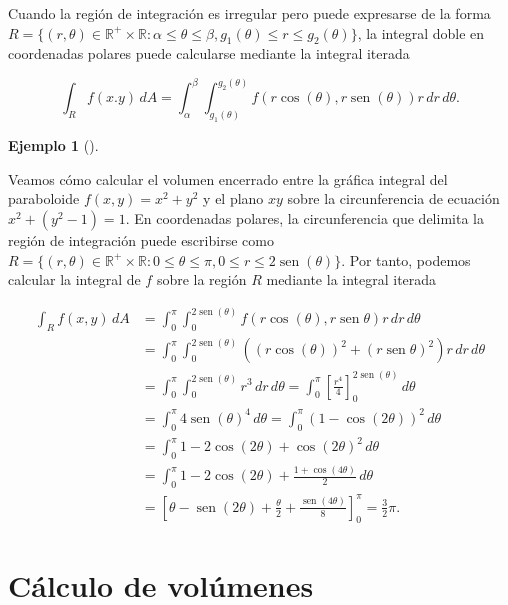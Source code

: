 \documentclass[
  a4paper,
]{scrreport}
\theoremstyle{definition}
\theoremstyle{definition}
\newtheorem{example}{Ejemplo}[chapter]
\theoremstyle{definition}
\theoremstyle{plain}
\theoremstyle{plain}
\theoremstyle{plain}
\theoremstyle{remark}
\begin{document}
Cuando la región de integración es irregular pero puede expresarse de la
forma
\(R=\{(r,\theta)\in \mathbb{R}^+\times \mathbb{R}: \alpha\leq \theta\leq \beta, g_1(\theta)\leq r\leq g_2(\theta)\}\),
la integral doble en coordenadas polares puede calcularse mediante la
integral iterada

\[
\int_R f(x.y)\,dA 
= \int_{\alpha}^{\beta} \int_{g_1(\theta)}^{g_2(\theta)} f(r\cos(\theta),r\operatorname{sen}(\theta))r\,dr\,d\theta.
\]

\begin{example}[]\protect\hypertarget{exm-integral-region-irregular-polar}{}\label{exm-integral-region-irregular-polar}

Veamos cómo calcular el volumen encerrado entre la gráfica integral del
paraboloide \(f(x,y)=x^2+y^2\) y el plano \(xy\) sobre la circunferencia
de ecuación \(x^2+(y^2-1)=1\). En coordenadas polares, la circunferencia
que delimita la región de integración puede escribirse como
\(R=\{(r,\theta)\in \mathbb{R}^+\times \mathbb{R}: 0\leq \theta\leq \pi, 0\leq r\leq 2\operatorname{sen}(\theta)\}\).
Por tanto, podemos calcular la integral de \(f\) sobre la región \(R\)
mediante la integral iterada

\begin{align*}
\int_R f(x,y)\,dA
&= \int_0^\pi \int_0^{2\operatorname{sen}(\theta)} f(r\cos(\theta),r\operatorname{sen}{\theta})r\,dr\,d\theta \\
&= \int_0^\pi \int_0^{2\operatorname{sen}(\theta)} ((r\cos(\theta))^2 + (r\operatorname{sen}{\theta})^2)r\,dr\,d\theta \\
&= \int_0^\pi \int_0^{2\operatorname{sen}(\theta)} r^3\,dr\,d\theta 
= \int_0^\pi \left[\frac{r^4}{4}\right]_0^{2\operatorname{sen}(\theta)} \,d\theta \\
&= \int_0^\pi 4\operatorname{sen}(\theta)^4 \,d\theta 
= \int_0^\pi (1-\cos(2\theta))^2\,d\theta \\ 
&= \int_0^\pi 1 - 2\cos(2\theta) + \cos(2\theta)^2 \,d\theta \\
&= \int_0^\pi 1 - 2\cos(2\theta) + \frac{1+\cos(4\theta)}{2}\,d\theta \\
&= \left[\theta - \operatorname{sen}(2\theta) + \frac{\theta}{2} + \frac{\operatorname{sen}(4\theta)}{8}\right]_0^\pi
= \frac{3}{2}\pi.
\end{align*}

\end{example}

\section{Cálculo de volúmenes}\label{cuxe1lculo-de-voluxfamenes}
\end{document}
